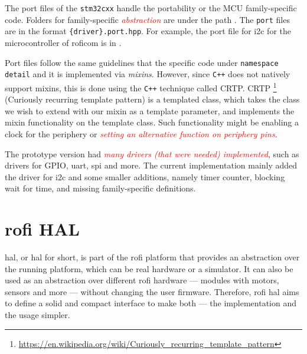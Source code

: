 \documentclass[
  digital,     %
  oneside,     %
  nosansbold,  %
  nocolorbold, %
  nolof,         %
  nolot,         %
]{fithesis4}
\newcommand{\TODO}[1]{\textcolor{red}{\textit{#1}}}
\newcommand{\TODOLIST}[1]{}
\begin{document}
{{{The port files of the \lstinline|stm32cxx| handle the portability or the MCU family-specific code. Folders for family-specific \TODO{abstraction} are under the path . The \verb|port| files are in the format \verb|{driver}.port.hpp|. For example, the port file for \acrshort{i2c} for the microcontroller of \acrshort{roficom} is in .

Port files follow the same guidelines that the specific code under \lstinline|namespace detail| and it is implemented via \emph{mixins}. However, since \verb|C++| does not natively support mixins, this is done using the \verb|C++| technique called CRTP. CRTP \footnote{\url{https://en.wikipedia.org/wiki/Curiously_recurring_template_pattern}} (Curiously recurring template pattern) is a templated class, which takes the class we wish to extend with our mixin as a template parameter, and implements the mixin functionality on the template class. Such functionality might be enabling a clock for the periphery or \TODO{setting an alternative function on periphery pins}.


The prototype version had \TODO{many drivers (that were needed) implemented}, such as drivers for GPIO, \acrshort{uart}, \acrshort{spi} and more. The current implementation mainly added the driver for \acrshort{i2c} and some smaller additions, namely timer counter, blocking wait for time, and missing family-specific definitions.

\section[ RoFI HAL ]{ \acrshort{rofi} HAL } \label{sec:rofi-hal-desc}
\TODOLIST{
\begin{itemize}
    \item ROFI HAL interface --- prototype vs changes
    \item ROFI HAL implementation esp32    
\end{itemize}
}

\acrlong{hal}, or \acrshort{hal} for short, is part of the \acrshort{rofi} platform that provides an abstraction over the running platform, which can be real hardware or a simulator. It can also be used as an abstraction over different \acrshort{rofi} hardware --- modules with motors, sensors and more --- without changing the user firmware. Therefore, \acrshort{rofi} \acrshort{hal} aims to define a solid and compact interface to make both --- the implementation and the usage simpler.

}}}
\end{document}
